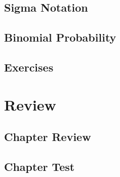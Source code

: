 \subsection{Sigma Notation}
\subsection{Binomial Probability}
\subsection{Exercises}

\newpage
\section{Review}
\subsection{Chapter Review}
\subsection{Chapter Test}

